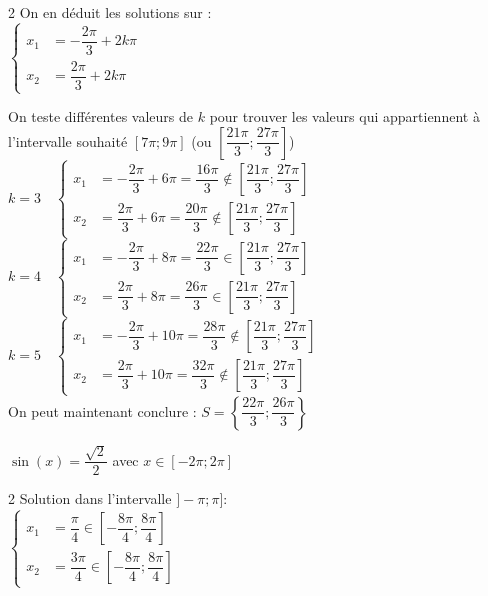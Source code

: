 \documentclass[11pt,a4paper]{article}  %
\begin{document}
\begin{enumMet}
\begin{corrBox}
\begin{multicols}{2}
			\columnbreak
			On en déduit les solutions sur \R:\\
			$\begin{cases}
				x_1 &=-\dfrac{2\pi}{3}+2k\pi\\
				x_2 &=\dfrac{2\pi}{3}+2k\pi\
			\end{cases}$\\
		\end{multicols}
		On teste différentes valeurs de $k$ pour trouver les valeurs qui appartiennent à l'intervalle souhaité $\left[7\pi;9\pi\right]$ (ou $\left[\dfrac{21\pi}{3};\dfrac{27\pi}{3}\right]$)\\
		$k=3\quad \begin{cases}
			x_1 &=-\dfrac{2\pi}{3}+6\pi=\dfrac{16\pi}{3}\notin\left[\dfrac{21\pi}{3};\dfrac{27\pi}{3}\right]\\
			x_2 &=\dfrac{2\pi}{3}+6\pi=\dfrac{20\pi}{3}\notin\left[\dfrac{21\pi}{3};\dfrac{27\pi}{3}\right]
		\end{cases}$\\
		$k=4\quad \begin{cases}
			x_1 &=-\dfrac{2\pi}{3}+8\pi=\dfrac{22\pi}{3}\in\left[\dfrac{21\pi}{3};\dfrac{27\pi}{3}\right]\\
			x_2 &=\dfrac{2\pi}{3}+8\pi=\dfrac{26\pi}{3}\in\left[\dfrac{21\pi}{3};\dfrac{27\pi}{3}\right]
		\end{cases}$\\
		$k=5\quad \begin{cases}
			x_1 &=-\dfrac{2\pi}{3}+10\pi=\dfrac{28\pi}{3}\notin\left[\dfrac{21\pi}{3};\dfrac{27\pi}{3}\right]\\
			x_2 &=\dfrac{2\pi}{3}+10\pi=\dfrac{32\pi}{3}\notin\left[\dfrac{21\pi}{3};\dfrac{27\pi}{3}\right]
		\end{cases}$\\
		On peut maintenant conclure : $S=\left\{\dfrac{22\pi}{3};\dfrac{26\pi}{3}\right\}$
	\end{corrBox}
	\newpage
	\item $\sin(x)=\dfrac{\sqrt{2}}{2}$ avec $x\in \left[-2\pi;2\pi\right]$\\
	\begin{corrBox}
		\begin{multicols}{2}
			Solution dans l'intervalle $]-\pi;\pi]$:\\
			$\begin{cases}
				x_1 &=\dfrac{\pi}{4}\in\left[-\dfrac{8\pi}{4};\dfrac{8\pi}{4}\right]\\
				x_2 &=\dfrac{3\pi}{4}\in\left[-\dfrac{8\pi}{4};\dfrac{8\pi}{4}\right]
			\end{cases}$\\
			

\end{multicols}
\end{corrBox}
\end{enumMet}
\end{document}
